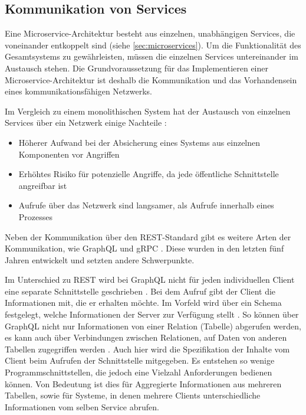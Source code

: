 \subsection{Kommunikation von Services}
\label{sec:kommunikation}

Eine Microservice-Architektur besteht aus einzelnen, unabhängigen Services, die voneinander entkoppelt sind (siehe \cref{sec:microservices}). Um die Funktionalität des Gesamtsystems zu gewährleisten, müssen die einzelnen Services untereinander im Austausch stehen. Die Grundvoraussetzung für das Implementieren einer Microservice-Architektur ist deshalb die Kommunikation und das Vorhandensein eines kommunikationsfähigen Netzwerks.

Im Vergleich zu einem monolithischen System hat der Austausch von einzelnen Services über ein Netzwerk einige Nachteile \parencite[vgl.][Kap. 6.1]{wolff_microservices_2018}:
\begin{itemize}
	\item Höherer Aufwand bei der Absicherung eines Systems aus einzelnen Komponenten vor Angriffen
	\item Erhöhtes Risiko für potenzielle Angriffe, da jede öffentliche Schnittstelle angreifbar ist
	\item Aufrufe über das Netzwerk sind langsamer, als Aufrufe innerhalb eines Prozesses
\end{itemize}

Neben der Kommunikation über den REST-Standard gibt es weitere Arten der Kommunikation, wie GraphQL \parencite{graphql_docs} und gRPC \parencite{grpc_docs}. Diese wurden in den letzten fünf Jahren entwickelt und setzten andere Schwerpunkte.

Im Unterschied zu REST wird bei GraphQL nicht für jeden individuellen Client eine separate Schnittstelle geschrieben \parencite[vgl.][]{graphql_docs}. Bei dem Aufruf gibt der Client die Informationen mit, die er erhalten möchte. Im Vorfeld wird über ein Schema festgelegt, welche Informationen der Server zur Verfügung stellt \parencite[vgl.][]{graphql_docs}. So können über GraphQL nicht nur Informationen von einer Relation (Tabelle) abgerufen werden, es kann auch über Verbindungen zwischen Relationen, auf Daten von anderen Tabellen zugegriffen werden \parencite[vgl.][]{graphql_docs}. Auch hier wird die Spezifikation der Inhalte vom Client beim Aufrufen der Schnittstelle mitgegeben. Es entstehen so wenige Programmschnittstellen, die jedoch eine Vielzahl Anforderungen bedienen können. Von Bedeutung ist dies für Aggregierte Informationen aus mehreren Tabellen, sowie für Systeme, in denen mehrere Clients unterschiedliche Informationen vom selben Service abrufen.


